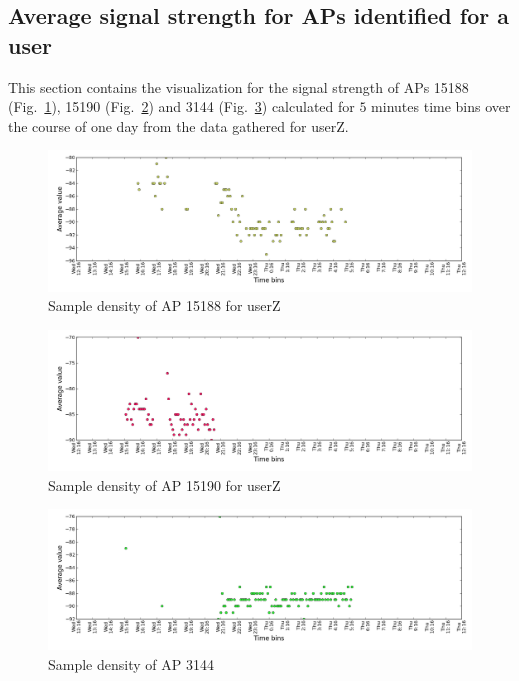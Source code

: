 \subsection{Average signal strength for APs identified for a user}
\label{appendix_avg_signal}

This section contains the visualization for the signal strength of APs 15188
(Fig.~\ref{avg_6_2nd_day_1_A}), 15190 (Fig.~\ref{avg_6_2nd_day_2_A}) and 3144
(Fig.~\ref{avg_6_2nd_day_3_A}) calculated for $5$ minutes time bins over the
course of one day from the data gathered for userZ.

\begin{figure}[!h]
\centering
\includegraphics[width =\textwidth]{figures/combinations/user_6_sorted_1days_plot_15188_avg_sig.png}
\caption{Sample density of AP 15188 for userZ}
\label{avg_6_2nd_day_1_A}
\end{figure}

\begin{figure}[!h]
\centering
\includegraphics[width =\textwidth]{figures/combinations/user_6_sorted_1days_plot_15190_avg_sig.png}
\caption{Sample density of AP 15190 for userZ}
\label{avg_6_2nd_day_2_A}
\end{figure}

\begin{figure}[!h]
\centering
\includegraphics[width =\textwidth]{figures/combinations/user_6_sorted_1days_plot_3144_avg_sig.png}
\caption{Sample density of AP 3144}
\label{avg_6_2nd_day_3_A}
\end{figure}

